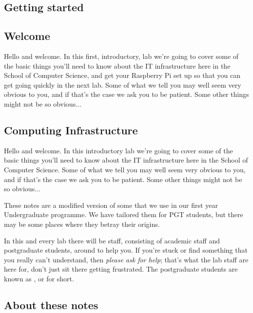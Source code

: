 \begin{firstonly}
\chapter{Getting started}
\label{cha:getting-started}
\minitoc
{}

\section{Welcome}

Hello and welcome. In this first, introductory, lab we're going to
cover some of the basic things you'll need to know about the IT
infrastructure here in the School of Computer Science, and get your
Raspberry Pi set up so that you can get going quickly in the next lab.
Some of what we tell you may well seem very obvious to you, and if
that's the case we ask you to be patient. Some other things might
not be so obvious...

\end{firstonly}


\begin{pgtonly}
  
\section{Computing Infrastructure}
\label{cha:getting-started}
Hello and welcome. In this introductory lab we're going to
cover some of the basic things you'll need to know about the IT
infrastructure here in the School of Computer Science.
Some of what we tell you may well seem very obvious to you, and if
that's the case we ask you to be patient. Some other things might
not be so obvious...

These notes are a modified version of some that we use in our first year Undergraduate programme. We have tailored them for PGT students, but there may be some places where they betray their origins.
\end{pgtonly}

In this and every lab there will be staff, consisting of academic
staff and postgraduate students, around to help you. If you're stuck
or find something that you really can't understand, then \emph{please
  ask for help}; that's what the lab staff are here for, don't just
sit there getting frustrated. The postgraduate students are known as
, or  for short.


\section{About these notes}
